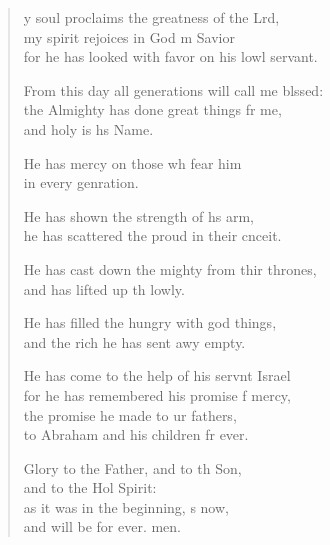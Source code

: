 \settowidth{\versewidth}{From this day all generations will call me blessed: +}
\begin{verse}%
  \begin{patverse}
y soul proclaims the greatness of the Lrd,\Flex\\
my spirit rejoices in God m Savior\Med\\
for he has looked with favor on his lowl servant.

From this day all generations will call me blssed:\Flex\\
the Almighty has done great things fr me,\Med\\
and holy is h\pointup{\i}s Name.

He has mercy on those wh fear him\Med\\
in every genration.

He has shown the strength of h\pointup{\i}s arm,\Med\\
he has scattered the proud in their cnceit.

He has cast down the mighty from thir thrones,\Med\\
and has lifted up th lowly.

He has filled the hungry with god things,\Med\\
and the rich he has sent awy empty.

He has come to the help of his servnt Israel\Med\\
for he has remembered his promise f mercy,\\
the promise he made to ur fathers,\Med\\
to Abraham and his children fr ever.

Glory to the Father, and to th Son,\Med\\
and to the Hol Spirit:\\
as it was in the beginning, \pointup{\i}s now,\Med\\
and will be for ever. men.
  \end{patverse}
\end{verse}
